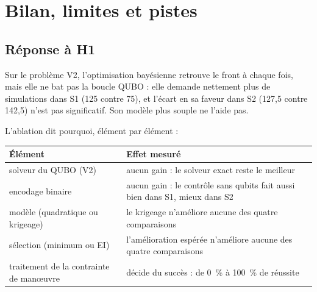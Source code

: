 \chapter{Bilan, limites et pistes}\label{ch:bilan}

\section{Réponse à H1}
\begin{resultat}
Sur le problème V2, l'optimisation bayésienne retrouve le front à chaque fois, mais elle ne bat pas la boucle QUBO : elle demande nettement plus de simulations dans S1 (125 contre 75), et l'écart en sa faveur dans S2 (127,5 contre 142,5) n'est pas significatif. Son modèle plus souple ne l'aide pas.
\end{resultat}

L'ablation dit pourquoi, élément par élément :
\begin{center}
\renewcommand{\arraystretch}{1.25}
\begin{tabularx}{\linewidth}{>{\raggedright\arraybackslash}p{4.2cm}X}
\toprule
Élément & Effet mesuré \\
\midrule
solveur du QUBO (V2) & aucun gain : le solveur exact reste le meilleur \\
encodage binaire & aucun gain : le contrôle sans qubits fait aussi bien dans S1, mieux dans S2 \\
modèle (quadratique ou krigeage) & le krigeage n'améliore aucune des quatre comparaisons \\
sélection (minimum ou EI) & l'amélioration espérée n'améliore aucune des quatre comparaisons \\
traitement de la contrainte de manœuvre & décide du succès : de 0~\% à 100~\% de réussite \\
\bottomrule
\end{tabularx}
\end{center}

